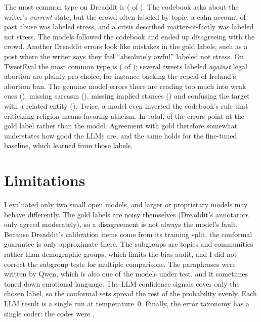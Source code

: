 \documentclass[10pt,twocolumn]{article}
\begin{document}
The most common type on Dreaddit is \emph{\errTopNameDr} (\errTopNDr{} of \errNDr). The codebook
asks about the writer's \emph{current} state, but the crowd often labeled by topic: a calm
account of past abuse was labeled stress, and a crisis described matter-of-factly was labeled
not stress. The models followed the codebook and ended up disagreeing with the crowd. Another
\errAmbiguousGoldDr{} Dreaddit errors look like mistakes in the gold labels, such as a post where
the writer says they feel ``absolutely awful'' labeled not stress. On TweetEval the most common
type is \emph{\errTopNameTe} (\errTopNTe{} of \errNTe); several tweets labeled \emph{against}
legal abortion are plainly pro-choice, for instance backing the repeal of Ireland's abortion
ban. The genuine model errors there are reading too much into weak cues (\errOverInferenceTe),
missing sarcasm (\errSarcasmIronyTe), missing implied stances (\errImplicitStanceTe) and
confusing the target with a related entity (\errTargetConfusionTe). Twice, a model even inverted
the codebook's rule that criticizing religion means favoring atheism. In total,
\errAmbiguousGoldTotal{} of the \errNCoded{} errors point at the gold label rather than the
model. Agreement with gold therefore somewhat understates how good the LLMs are, and the same
holds for the fine-tuned baseline, which learned from those labels.
\begin{table}[t]
\centering\small

\caption{Primary error type in \errNCoded{} sampled LLM errors (codes \errStatus).}
\label{tab:errors}
\end{table}
\fi

\section{Limitations}
I evaluated only two small open models, and larger or proprietary models may behave
differently. The gold labels are noisy themselves (Dreaddit's annotators only agreed moderately),
so a disagreement is not always the model's fault. Because Dreaddit's calibration items come
from its training split, the conformal guarantee is only approximate there. The subgroups are
topics and communities rather than demographic groups, which limits the bias audit, and I did
not correct the subgroup tests for multiple comparisons. The paraphrases were written by Qwen,
which is also one of the models under test, and it sometimes toned down emotional language.
The LLM confidence signals cover only the chosen label, so the conformal sets spread the rest of
the probability evenly. Each LLM result is a single run at temperature~0. Finally, the error
taxonomy has a single coder: the codes were \errStatus.
\end{document}
